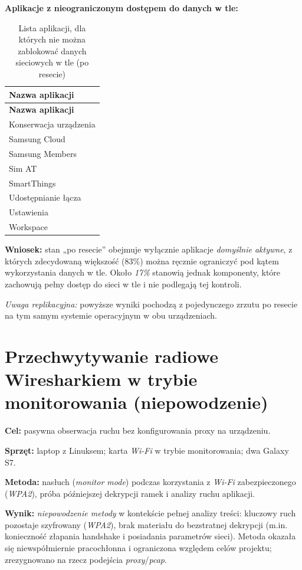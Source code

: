 \textbf{Aplikacje z nieograniczonym dostępem do danych w tle:}
\begin{longtable}{@{}l@{}}
\caption{Lista aplikacji, dla których nie można zablokować danych sieciowych w tle (po resecie)}\label{tab:default-apps-non-disablable}\\
\toprule
\textbf{Nazwa aplikacji} \\
\midrule
\endfirsthead
\toprule
\textbf{Nazwa aplikacji} \\
\midrule
\endhead
\bottomrule
\endfoot
Konserwacja urządzenia \\
Samsung Cloud \\
Samsung Members \\
Sim AT \\
SmartThings \\
Udostępnianie łącza \\
Ustawienia \\
Workspace \\
\end{longtable}

\textbf{Wniosek:} stan „po resecie” obejmuje wyłącznie aplikacje \emph{domyślnie aktywne}, z których zdecydowaną większość (83\%) można ręcznie ograniczyć pod kątem wykorzystania danych w tle. Około \emph{17\%} stanowią jednak komponenty, które zachowują pełny dostęp do sieci w tle i nie podlegają tej kontroli.

\medskip
\noindent\emph{Uwaga replikacyjna:} powyższe wyniki pochodzą z pojedynczego zrzutu po resecie na tym samym systemie operacyjnym w obu urządzeniach.

\vspace{1ex}

\section{Przechwytywanie radiowe Wiresharkiem w trybie monitorowania (niepowodzenie)}
\textbf{Cel:} pasywna obserwacja ruchu bez konfigurowania proxy na urządzeniu.

\textbf{Sprzęt:} laptop z Linuksem; karta \emph{Wi-Fi} w trybie monitorowania; dwa Galaxy S7.

\textbf{Metoda:} nasłuch (\emph{monitor mode}) podczas korzystania z \emph{Wi-Fi} zabezpieczonego (\emph{WPA2}), próba późniejszej dekrypcji ramek i analizy ruchu aplikacji.

\textbf{Wynik:} \textit{niepowodzenie metody} w kontekście pełnej analizy treści: kluczowy ruch pozostaje szyfrowany (\emph{WPA2}), brak materiału do bezstratnej dekrypcji (m.in. konieczność złapania handshake i posiadania parametrów sieci). Metoda okazała się niewspółmiernie pracochłonna i ograniczona względem celów projektu; zrezygnowano na rzecz podejścia \emph{proxy}/\emph{pcap}.

